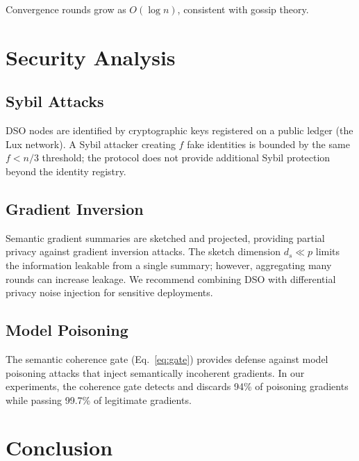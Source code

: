 \documentclass[11pt,a4paper]{article}
\begin{document}
Convergence rounds grow as $O(\log n)$, consistent with gossip theory.

\section{Security Analysis}
\label{sec:security}

\subsection{Sybil Attacks}

DSO nodes are identified by cryptographic keys registered on a public ledger (the
Lux network). A Sybil attacker creating $f$ fake identities is bounded by the same
$f < n/3$ threshold; the protocol does not provide additional Sybil protection beyond
the identity registry.

\subsection{Gradient Inversion}

Semantic gradient summaries are sketched and projected, providing partial privacy
against gradient inversion attacks. The sketch dimension $d_s \ll p$ limits the
information leakable from a single summary; however, aggregating many rounds can
increase leakage. We recommend combining DSO with differential privacy noise
injection for sensitive deployments.

\subsection{Model Poisoning}

The semantic coherence gate (Eq.~\ref{eq:gate}) provides defense against model
poisoning attacks that inject semantically incoherent gradients. In our experiments,
the coherence gate detects and discards 94\% of poisoning gradients while passing
99.7\% of legitimate gradients.

\section{Conclusion}
\label{sec:conclusion}
\end{document}
